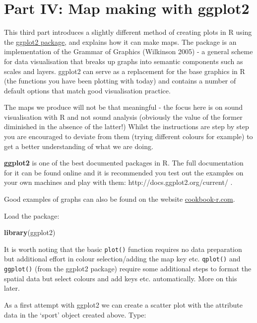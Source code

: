 \documentclass[]{article}
\newenvironment{Shaded}{}{}
\newcommand{\KeywordTok}[1]{\textcolor[rgb]{0.00,0.44,0.13}{\textbf{{#1}}}}
\newcommand{\NormalTok}[1]{{#1}}
\begin{document}
\section{Part IV: Map making with
ggplot2}\label{part-iv-map-making-with-ggplot2}

This third part introduces a slightly different method of creating plots
in R using the \href{http://ggplot2.org/}{ggplot2 package}, and explains
how it can make maps. The package is an implementation of the Grammar of
Graphics (Wilkinson 2005) - a general scheme for data visualisation that
breaks up graphs into semantic components such as scales and layers.
ggplot2 can serve as a replacement for the base graphics in R (the
functions you have been plotting with today) and contains a number of
default options that match good visualisation practice.

The maps we produce will not be that meaningful - the focus here is on
sound visualisation with R and not sound analysis (obviously the value
of the former diminished in the absence of the latter!) Whilst the
instructions are step by step you are encouraged to deviate from them
(trying different colours for example) to get a better understanding of
what we are doing.

\textbf{ggplot2} is one of the best documented packages in R. The full
documentation for it can be found online and it is recommended you test
out the examples on your own machines and play with them:
http://docs.ggplot2.org/current/ .

Good examples of graphs can also be found on the website
\href{http://www.cookbook-r.com/Graphs/}{cookbook-r.com}.

Load the package:

\begin{Shaded}
\begin{Highlighting}[]
\KeywordTok{library}\NormalTok{(ggplot2)}
\end{Highlighting}
\end{Shaded}

It is worth noting that the basic \texttt{plot()} function requires no
data preparation but additional effort in colour selection/adding the
map key etc. \texttt{qplot()} and \texttt{ggplot()} (from the ggplot2
package) require some additional steps to format the spatial data but
select colours and add keys etc. automatically. More on this later.

As a first attempt with ggplot2 we can create a scatter plot with the
attribute data in the `sport' object created above. Type:
\end{document}
